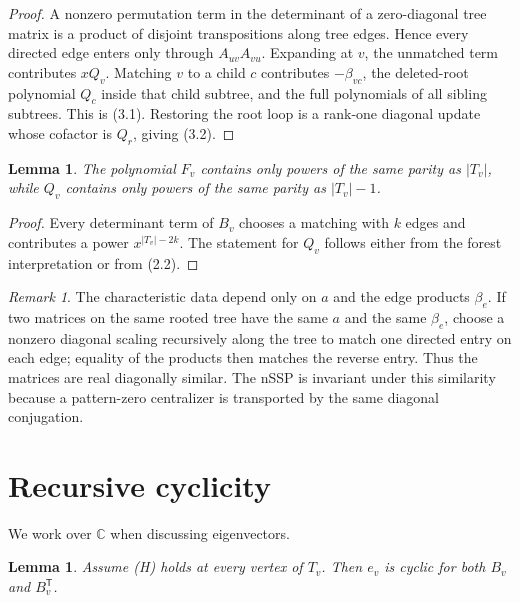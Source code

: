 \documentclass[11pt]{article}
\newtheorem{lemma}[theorem]{Lemma}
\theoremstyle{remark}
\newtheorem{remark}[theorem]{Remark}
\begin{document}
\begin{proof}

A nonzero permutation term in the determinant of a zero-diagonal tree matrix is a product of disjoint transpositions along tree edges. Hence every directed edge enters only through $A_{uv}A_{vu}$. Expanding at $v$, the unmatched term contributes $xQ_v$. Matching $v$ to a child $c$ contributes $-\beta_{vc}$, the deleted-root polynomial $Q_c$ inside that child subtree, and the full polynomials of all sibling subtrees. This is (3.1). Restoring the root loop is a rank-one diagonal update whose cofactor is $Q_r$, giving (3.2).

\end{proof}

\begin{lemma}

The polynomial $F_v$ contains only powers of the same parity as $|T_v|$, while $Q_v$ contains only powers of the same parity as $|T_v|-1$.

\end{lemma}

\begin{proof}

Every determinant term of $B_v$ chooses a matching with $k$ edges and contributes a power $x^{|T_v|-2k}$. The statement for $Q_v$ follows either from the forest interpretation or from (2.2).

\end{proof}

\begin{remark}

The characteristic data depend only on $a$ and the edge products $\beta_e$. If two matrices on the same rooted tree have the same $a$ and the same $\beta_e$, choose a nonzero diagonal scaling recursively along the tree to match one directed entry on each edge; equality of the products then matches the reverse entry. Thus the matrices are real diagonally similar. The nSSP is invariant under this similarity because a pattern-zero centralizer is transported by the same diagonal conjugation.

\end{remark}

\section{Recursive cyclicity}


We work over $\mathbb C$ when discussing eigenvectors.

\begin{lemma}

Assume (H) holds at every vertex of $T_v$. Then $e_v$ is cyclic for both $B_v$ and $B_v^{\mathsf T}$.

\end{lemma}
\end{document}
